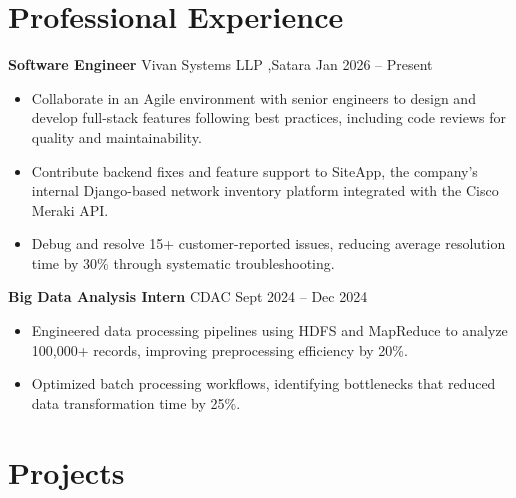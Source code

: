 \documentclass[10pt,a4paper]{article}
\begin{document}
\section*{Professional Experience}

\textbf{Software Engineer} \hfill Vivan Systems LLP ,Satara \hfill Jan 2026 -- Present
\begin{itemize}
    \item Collaborate in an Agile environment with senior engineers to design and develop full-stack features following best practices, including code reviews for quality and maintainability.
    \item Contribute backend fixes and feature support to SiteApp, the company's internal Django-based network inventory platform integrated with the Cisco Meraki API.
    \item Debug and resolve 15+ customer-reported issues, reducing average resolution time by 30\% through systematic troubleshooting.
\end{itemize}

\textbf{Big Data Analysis Intern} \hfill CDAC \hfill Sept 2024 -- Dec 2024
\begin{itemize}
    \item Engineered data processing pipelines using HDFS and MapReduce to analyze 100,000+ records, improving preprocessing efficiency by 20\%.
    \item Optimized batch processing workflows, identifying bottlenecks that reduced data transformation time by 25\%.
\end{itemize}

\section*{Projects}
\end{document}
